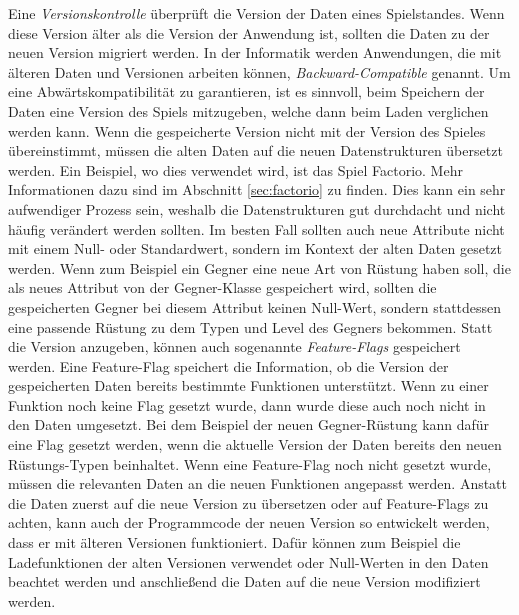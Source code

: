 Eine \textit{Versionskontrolle} überprüft die Version der Daten eines Spielstandes. Wenn diese Version älter als die Version der Anwendung ist, sollten die Daten zu der neuen Version migriert werden. In der Informatik werden Anwendungen, die mit älteren Daten und Versionen arbeiten können, \textit{Backward-Compatible} genannt.\cite{mediumEnsuringBackwards} Um eine Abwärtskompatibilität zu garantieren, ist es sinnvoll, beim Speichern der Daten eine Version des Spiels mitzugeben, welche dann beim Laden verglichen werden kann. Wenn die gespeicherte Version nicht mit der Version des Spieles übereinstimmt, müssen die alten Daten auf die neuen Datenstrukturen übersetzt werden. Ein Beispiel, wo dies verwendet wird, ist das Spiel Factorio. Mehr Informationen dazu sind im Abschnitt \ref{sec:factorio} zu finden. Dies kann ein sehr aufwendiger Prozess sein, weshalb die Datenstrukturen gut durchdacht und nicht häufig verändert werden sollten. Im besten Fall sollten auch neue Attribute nicht mit einem Null- oder Standardwert, sondern im Kontext der alten Daten gesetzt werden. Wenn zum Beispiel ein Gegner eine neue Art von Rüstung haben soll, die als neues Attribut von der Gegner-Klasse gespeichert wird, sollten die gespeicherten Gegner bei diesem Attribut keinen Null-Wert, sondern stattdessen eine passende Rüstung zu dem Typen und Level des Gegners bekommen. Statt die Version anzugeben, können auch sogenannte \textit{Feature-Flags} gespeichert werden. Eine Feature-Flag speichert die Information, ob die Version der gespeicherten Daten bereits bestimmte Funktionen unterstützt. Wenn zu einer Funktion noch keine Flag gesetzt wurde, dann wurde diese auch noch nicht in den Daten umgesetzt. Bei dem Beispiel der neuen Gegner-Rüstung kann dafür eine Flag gesetzt werden, wenn die aktuelle Version der Daten bereits den neuen Rüstungs-Typen beinhaltet. Wenn eine Feature-Flag noch nicht gesetzt wurde, müssen die relevanten Daten an die neuen Funktionen angepasst werden. Anstatt die Daten zuerst auf die neue Version zu übersetzen oder auf Feature-Flags zu achten, kann auch der Programmcode der neuen Version so entwickelt werden, dass er mit älteren Versionen funktioniert. Dafür können zum Beispiel die Ladefunktionen der alten Versionen verwendet oder Null-Werten in den Daten beachtet werden und anschließend die Daten auf die neue Version modifiziert werden.\cite{mediumEnsuringBackwards} 

